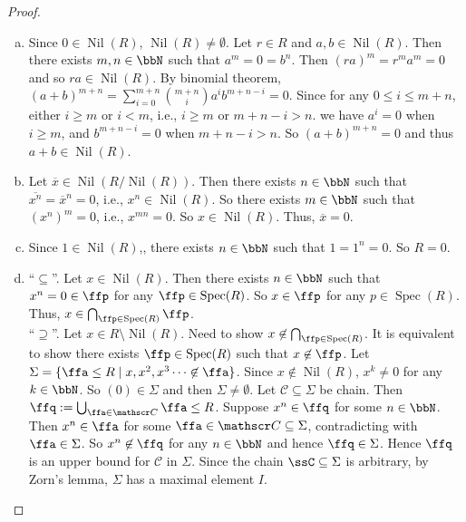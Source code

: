 \begin{proof}
    \begin{enumerate}[(a)]
        \item Since $0 \in \operatorname{Nil}(R)$, $\operatorname{Nil}(R) \neq \emptyset$. Let $r \in R$ and $a,b \in \operatorname{Nil}(R)$. Then there exists $m,n \in \bbN$ such that $a^m = 0 = b^n$. Then $(ra)^m = r^ma^m = 0$ and so $ra \in \operatorname{Nil}(R)$. By binomial theorem, $(a+b)^{m+n} = \sum_{i=0}^{m+n} \binom {m+n} i a^i b^{m+n-i} = 0$. Since for any $0 \leq i \leq m+n$, either $i \geq m$ or $i < m$, i.e., $i \geq m$ or $m+n-i > n$. we have $a^i = 0$ when $i \geq m$, and $b^{m+n-i} = 0 $ when $m +n-i > n$. So $(a+b)^{m+n} = 0$ and thus $a+b \in \operatorname{Nil}(R)$.
        \item Let $\overline x \in \operatorname{Nil}(R/\operatorname{Nil}(R))$. Then there exists $n \in \bbN$ such that $\overline {x^n} = \overline x^n = 0$, i.e., $x^n \in \operatorname{Nil}(R)$. So there exists $m \in \bbN$ such that $(x^n)^m = 0$, i.e., $x^{mn} = 0$. So $x \in \operatorname{Nil}(R)$. Thus, $\overline x = 0$.
        \item Since $1 \in \operatorname{Nil}(R)$,, there exists $n \in \bbN$ such that $1 = 1^n = 0$. So $R = 0$.
        \item ``$\subseteq$''. Let $x \in \operatorname{Nil}(R)$. Then there exists $n \in \bbN$ such that $x^n = 0 \in \ffp$ for any $\ffp \in \operatorname{Spec}(R)$. So $x \in \ffp$ for any $p \in \operatorname{Spec}(R)$. Thus, $x \in \bigcap_{\ffp \in \operatorname{Spec}(R)} \ffp$. \\
            ``$\supseteq$''. Let $x \in R \setminus \operatorname{Nil}(R)$. Need to show $x \not \in \bigcap_{\ffp \in \operatorname{Spec}(R)}$. It is equivalent to show there exists $\ffp \in \operatorname{Spec}(R)$ such that $x \not \in \ffp$. Let $\Sigma = \{\ffa \leq R \mid x,x^2,x^3 \cdots \not \in \ffa\}$. Since $x \not \in \operatorname{Nil}(R)$, $x^k \neq 0$ for any $k \in \bbN$. So $(0) \in \Sigma$ and then $\Sigma \neq \emptyset$. Let $\mathscr C \subseteq \Sigma$ be chain. Then $\ffq := \bigcup_{\ffa \in \mathscr C} \ffa \leq R$. Suppose $x^n \in \ffq$ for some $n \in \bbN$. Then $x^n \in \ffa$ for some $\ffa \in \mathscr C \subseteq \Sigma$, contradicting with $\ffa \in \Sigma$. So $x^n \not \in \ffq$ for any $n \in \bbN$ and hence $\ffq \in \Sigma$. Hence $\ffq$ is an upper bound for $\mathscr C$ in $\Sigma$. Since the chain $\ssC \subseteq \Sigma$ is arbitrary, by Zorn's lemma, $\Sigma$ has a maximal element $I$. \\

\end{enumerate}
\end{proof}
